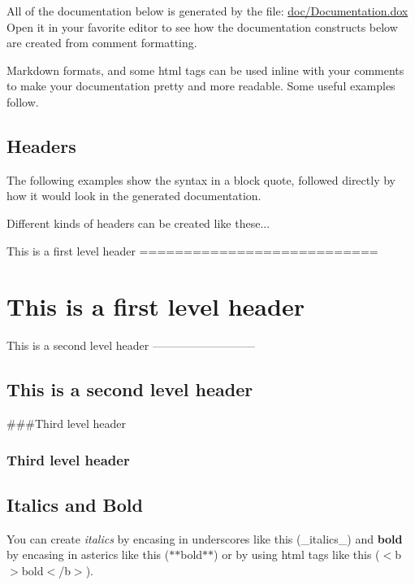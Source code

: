 All of the documentation below is generated by the file\+: {\ttfamily \hyperlink{Documentation_8dox}{doc/\+Documentation.\+dox}}~\newline
Open it in your favorite editor to see how the documentation constructs below are created from comment formatting.

Markdown formats, and some html tags can be used inline with your comments to make your documentation pretty and more readable. Some useful examples follow.

\subsection*{Headers }

The following examples show the syntax in a block quote, followed directly by how it would look in the generated documentation.

Different kinds of headers can be created like these... \begin{DoxyVerb}  This is a first level header
  ===========================
\end{DoxyVerb}


\section*{This is a first level header }

\begin{DoxyVerb}  This is a second level header
  ---------------------------
\end{DoxyVerb}


\subsection*{This is a second level header }

\begin{DoxyVerb}  ###Third level header
\end{DoxyVerb}


\subsubsection*{Third level header}

\subsection*{Italics and Bold }

You can create {\itshape italics} by encasing in underscores like this (\+\_\+italics\+\_\+) and {\bfseries bold} by encasing in asterics like this ($\ast$$\ast$bold$\ast$$\ast$) or by using html tags like this ($<$b$>$bold$<$/b$>$).

